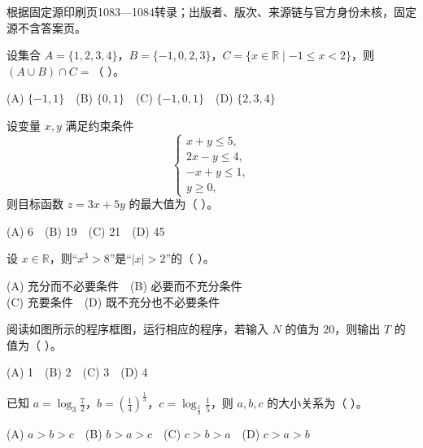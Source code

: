 


\begin{gktip}
根据固定源印刷页1083—1084转录；出版者、版次、来源链与官方身份未核，固定源不含答案页。
\end{gktip}


\begin{question}
设集合 $A=\{1,2,3,4\}$，$B=\{-1,0,2,3\}$，$C=\{x\in\mathbb R\mid -1\leqslant x<2\}$，则 $(A\cup B)\cap C=$（ ）。

(A) $\{-1,1\}$　(B) $\{0,1\}$　(C) $\{-1,0,1\}$　(D) $\{2,3,4\}$

\end{question}
\begin{question}
设变量 $x,y$ 满足约束条件
\nopagebreak[4]
\[
\begin{cases}
x+y\leqslant5,\\
2x-y\leqslant4,\\
-x+y\leqslant1,\\
y\geqslant0,
\end{cases}
\]
则目标函数 $z=3x+5y$ 的最大值为（ ）。

(A) 6　(B) 19　(C) 21　(D) 45

\end{question}
\begin{question}
设 $x\in\mathbb R$，则“$x^3>8$”是“$|x|>2$”的（ ）。

(A) 充分而不必要条件　(B) 必要而不充分条件\\
(C) 充要条件　(D) 既不充分也不必要条件

\Needspace{0.4\textheight}
\end{question}
\begingroup
\renewenvironment{question}{\Needspace{0.5\textheight}}{}
\begin{question}

阅读如图所示的程序框图，运行相应的程序，若输入 $N$ 的值为 20，则输出 $T$ 的值为（ ）。
\nopagebreak[4]
\begin{center}\end{center}
\nopagebreak[4]
(A) 1　(B) 2　(C) 3　(D) 4

\end{question}
\endgroup
\begin{question}
已知 $a=\log_3\frac72$，$b=\left(\frac14\right)^{\frac13}$，$c=\log_{\frac13}\frac15$，则 $a,b,c$ 的大小关系为（ ）。

(A) $a>b>c$　(B) $b>a>c$　(C) $c>b>a$　(D) $c>a>b$

\end{question}
